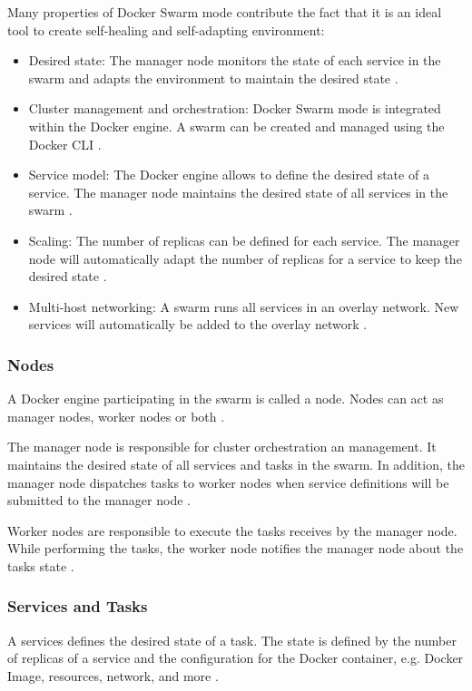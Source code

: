 % 
Many properties of Docker Swarm mode contribute the fact that it is an ideal tool to create self-healing and self-adapting environment:
\begin{itemize}
\item Desired state: The manager node monitors the state of each service in the swarm and adapts the environment to maintain the desired state \cite{Docker2020Docs}.

\item Cluster management and orchestration: Docker Swarm mode is integrated within the Docker engine. A swarm can be created and managed using the Docker CLI \cite{Docker2020Docs}.

\item Service model: The Docker engine allows to define the desired state of a service. The manager node maintains the desired state of all services in the swarm \cite{Docker2020Docs}.

\item Scaling: The number of replicas can be defined for each service. The manager node will automatically adapt the number of replicas for a service to keep the desired state \cite{Docker2020Docs}.

\item Multi-host networking: A swarm runs all services in an overlay network. New services will automatically be added to the overlay network \cite{Docker2020Docs}.
\end{itemize}


\subsubsection{Nodes}
A Docker engine participating in the swarm is called a node.
Nodes can act as manager nodes, worker nodes or both \cite{Docker2020Docs}.


The manager node is responsible for cluster orchestration an management. It maintains the desired state of all services and tasks in the swarm. In addition, the manager node dispatches tasks to worker nodes when service definitions will be submitted to the manager node \cite{Docker2020Docs}.


Worker nodes are responsible to execute the tasks receives by the manager node. While performing the tasks, the worker node notifies the manager node about the tasks state \cite{Docker2020Docs}.


\subsubsection{Services and Tasks}
A services defines the desired state of a task. The state is defined by the number of replicas of a service and the configuration for the Docker container, e.g. Docker Image, resources, network, and more \cite{Docker2020Docs}.


